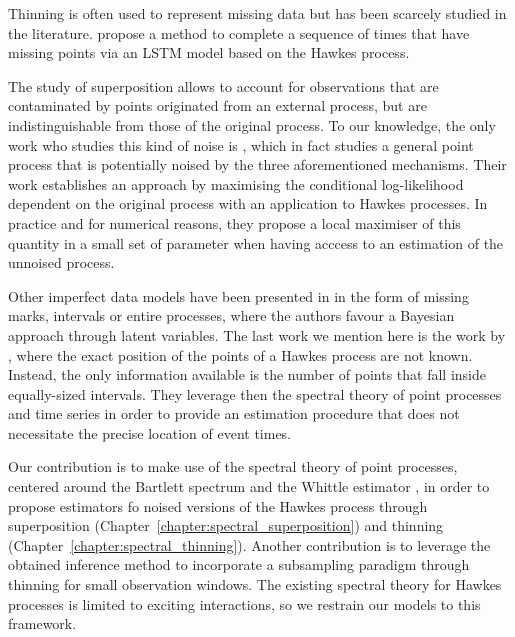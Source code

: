   Thinning is often used to represent missing data but has been scarcely studied in the literature. \textcite{Mei2019} propose a method to complete a sequence of times that have missing points via an LSTM model based on the Hawkes process.
  
  The study of superposition allows to account for observations that are contaminated by points originated from an external process, but are indistinguishable from those of the original process. 
  To our knowledge, the only work who studies this kind of noise is \textcite{Lund2000}, which in fact studies a general point process that is potentially noised by the three aforementioned mechanisms.
  Their work establishes an approach by maximising the conditional log-likelihood dependent on the original process with an application to Hawkes processes.
  In practice and for numerical reasons, they propose a local maximiser of this quantity in a small set of parameter when having acccess to an estimation of the unnoised process.

  Other imperfect data models have been presented in \textcite{Linderman2014} in the form of missing marks, intervals or entire processes, where the authors favour a Bayesian approach through latent variables. 
  The last work we mention here is the work by \textcite{Cheysson2022}, where the exact position of the points of a Hawkes process are not known. 
  Instead, the only information available is the number of points that fall inside equally-sized intervals.
  They leverage then the spectral theory of point processes and time series in order to provide an estimation procedure that does not necessitate the precise location of event times.
  
  Our contribution is to make use of the spectral theory of point processes, centered around the Bartlett spectrum \parencite{Bartlett1964} and the Whittle estimator \parencite{Whittle1952}, in order to propose estimators fo noised versions of the Hawkes process through superposition (Chapter~\ref{chapter:spectral_superposition}) and thinning (Chapter~\ref{chapter:spectral_thinning}).
  Another contribution is to leverage the obtained inference method to incorporate a subsampling paradigm through thinning for small observation windows.
  The existing spectral theory for Hawkes processes is limited to exciting interactions, so we restrain our models to this framework.
  
  




